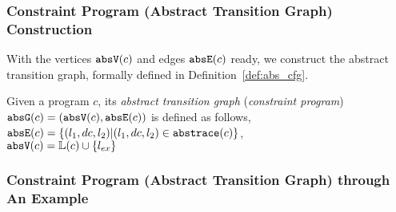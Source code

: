 \subsubsection{Constraint Program (Abstract Transition Graph) Construction} 
With the vertices $\mathtt{abs}{\mathtt{V}}(c)$ and edges $\mathtt{abs}{\mathtt{E}}(c)$ ready, we construct the abstract transition graph, formally 
defined in 
Definition~\ref{def:abs_cfg}.
%
\begin{defn}
\label{def:abs_cfg}
Given a program $c$, 
its \emph{abstract transition graph} (\emph{constraint program}) $\mathtt{abs}{\mathtt{G}}(c) =(\mathtt{abs}{\mathtt{V}}(c), \mathtt{abs}{\mathtt{E}}(c))$ is defined as follows,
\\
$\mathtt{abs}{\mathtt{E}}(c) = \{(l_1, dc, l_2) | (l_1, dc, l_2) \in \mathtt{abs}{\mathtt{trace}}(c)\}$,
\\
$\mathtt{abs}{\mathtt{V}}(c) = \mathbb{L}(c)\cup\{l_{ex}\}$
\end{defn}
%
\subsubsection{Constraint Program (Abstract Transition Graph) through An Example}
\label{sec:abscfg_example}
% 
%

%
